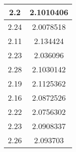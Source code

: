 \begin{table}[]
\begin{tabular}{|c|c|}
    2.2                        & 2.1010406                \\ \hline
    2.24                       & 2.0078518                \\ \hline
    2.11                       & 2.134424                 \\ \hline
    2.23                       & 2.036096                 \\ \hline
    2.28                       & 2.1030142                \\ \hline
    2.19                       & 2.1125362                \\ \hline
    2.16                       & 2.0872526                \\ \hline
    2.22                       & 2.0756302                \\ \hline
    2.23                       & 2.0908337                \\ \hline
    2.26                       & 2.093703                 \\ \hline
    \end{tabular}
    \end{table}
